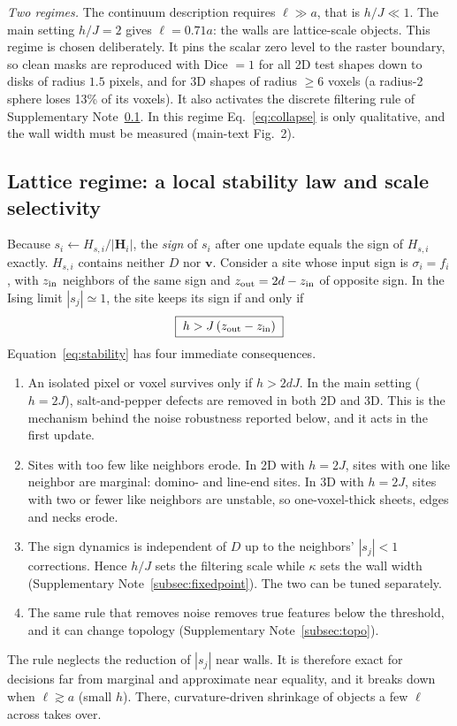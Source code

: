 \documentclass[11pt,a4paper]{article}
\newcommand{\vv}{\bm v}
\begin{document}
\emph{Two regimes.} The continuum description requires $\ell\gg a$, that is $h/J\ll1$. The main setting $h/J=2$ gives $\ell=0.71a$: the walls are lattice-scale objects. This regime is chosen deliberately. It pins the scalar zero level to the raster boundary, so clean masks are reproduced with Dice $=1$ for all 2D test shapes down to disks of radius $1.5$ pixels, and for 3D shapes of radius $\ge6$ voxels (a radius-2 sphere loses 13\% of its voxels). It also activates the discrete filtering rule of Supplementary Note~\ref{subsec:stability}. In this regime Eq.~\eqref{eq:collapse} is only qualitative, and the wall width must be measured (main-text Fig.~2).

\subsection{Lattice regime: a local stability law and scale selectivity}\label{subsec:stability}
Because $s_i\leftarrow H_{s,i}/|\bm H_i|$, the \emph{sign} of $s_i$ after one update equals the sign of $H_{s,i}$ exactly. $H_{s,i}$ contains neither $D$ nor $\vv$. Consider a site whose input sign is $\sigma_i=f_i$, with $z_{\rm in}$ neighbors of the same sign and $z_{\rm out}=2d-z_{\rm in}$ of opposite sign. In the Ising limit $|s_j|\simeq1$, the site keeps its sign if and only if
\begin{equation}
 \boxed{\;h>J\,(z_{\rm out}-z_{\rm in})\;}
 \label{eq:stability}
\end{equation}
Equation~\eqref{eq:stability} has four immediate consequences.
\begin{enumerate}[label=(\roman*),leftmargin=2em,itemsep=0.1em]
\item An isolated pixel or voxel survives only if $h>2dJ$. In the main setting ($h=2J$), salt-and-pepper defects are removed in both 2D and 3D. This is the mechanism behind the noise robustness reported below, and it acts in the first update.
\item Sites with too few like neighbors erode. In 2D with $h=2J$, sites with one like neighbor are marginal: domino- and line-end sites. In 3D with $h=2J$, sites with two or fewer like neighbors are unstable, so one-voxel-thick sheets, edges and necks erode.
\item The sign dynamics is independent of $D$ up to the neighbors' $|s_j|<1$ corrections. Hence $h/J$ sets the filtering scale while $\kappa$ sets the wall width (Supplementary Note~\ref{subsec:fixedpoint}). The two can be tuned separately.
\item The same rule that removes noise removes true features below the threshold, and it can change topology (Supplementary Note~\ref{subsec:topo}).
\end{enumerate}
The rule neglects the reduction of $|s_j|$ near walls. It is therefore exact for decisions far from marginal and approximate near equality, and it breaks down when $\ell\gtrsim a$ (small $h$). There, curvature-driven shrinkage of objects a few $\ell$ across takes over.
\end{document}
